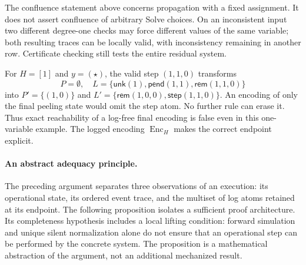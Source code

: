 The confluence statement above concerns propagation with a fixed assignment.
It does not assert confluence of arbitrary Solve choices. On an inconsistent
input two different degree-one checks may force different values of the same
variable; both resulting traces can be locally valid, with inconsistency
remaining in another row. Certificate checking still tests the entire residual
system.

\begin{exa}
\label{exa:sem-log}
For $H=[1]$ and $y=(\star)$, the valid step $(1,1,0)$ transforms
\[
 P=\emptyset,\quad
 L=\{\mathsf{unk}(1),\mathsf{pend}(1,1),\mathsf{rem}(1,1,0)\}
\]
into $P'=\{(1,0)\}$ and
$L'=\{\mathsf{rem}(1,0,0),\mathsf{step}(1,1,0)\}$.
An encoding of only the final peeling state would omit the step atom.
No further rule can erase it. Thus exact reachability of a log-free final
encoding is false even in this one-variable example.
The logged encoding $\operatorname{Enc}_H$ makes the correct endpoint explicit.
\end{exa}

\paragraph{An abstract adequacy principle.}
The preceding argument separates three observations of an execution: its
operational state, its ordered event trace, and the multiset of log atoms
retained at its endpoint. The following proposition isolates a sufficient
proof architecture. Its completeness hypothesis includes a local lifting
condition: forward simulation and unique silent normalization alone do not
ensure that an operational step can be performed by the concrete system.
The proposition is a mathematical abstraction of the argument, not an
additional mechanized result.

